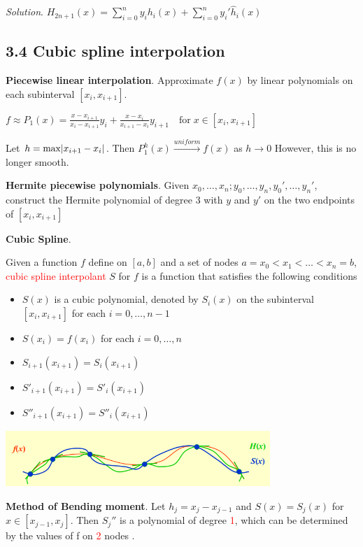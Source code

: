 \documentclass[11pt]{article}
\begin{document}
    \emph{Solution}.
    \(H_{2n+1}(x)=\displaystyle\sum_{i=0}^ny_ih_i(x)+\displaystyle\sum_{i=0}^ny_i'
    \hat{h}_i(x)\)
    \subsection{3.4 Cubic spline interpolation}
    \label{sec:org1999dd5}
    \textbf{Piecewise linear interpolation}. Approximate \(f(x)\) by linear polynomials on
    each subinterval \([x_i,x_{i+1}]\).

    \(f\approx P_1(x)=\frac{x-x_{i+1}}{x_i-x_{i+1}}y_i+\frac{x-x_i}
    {x_{i+1}-x_i}y_{i+1} \quad\text{for} \;x\in[x_i,x_{i+1}]\) 

    Let \(h=\max\abs{x_{i+1}-x_i}\). Then \(P_1^h(x)\xrightarrow{uniform} f(x)\) as
    \(h\to 0\) 
    However, this is no longer smooth.

    \textbf{Hermite piecewise polynomials}. Given
    \(x_0,\dots,x_n;y_0,\dots,y_n,y_0',\dots,y_n'\), construct the Hermite
    polynomial of degree 3 with \(y\) and \(y'\) on the two endpoints of
    \([x_i,x_{i+1}]\)

    \textbf{Cubic Spline}.
    \begin{definition}
      Given a function $f$ define on $[a,b]$ and a set of nodes $a=x_0<x_1<\dots<x_n=b$,
      \textcolor{red}{cubic spline interpolant} $S$ for $f$ is a function that satisfies
      the following conditions
      \begin{itemize}
      \item $S(x)$ is a cubic polynomial, denoted by $S_i(x)$ on the subinterval
        $[x_i,x_{i+1}]$ for each $i=0,\dots,n-1$
      \item $S(x_i)=f(x_i)$ for each $i=0,\dots, n$
      \item $S_{i+1}(x_{i+1})=S_i(x_{i+1})$
      \item $S'_{i+1}(x_{i+1})=S'_i(x_{i+1})$
      \item $S''_{i+1}(x_{i+1})=S''_i(x_{i+1})$
      \end{itemize}
    \end{definition}

    \includegraphics[width=100mm]{CubicSpline}

    \textbf{Method of Bending moment}. Let \(h_j=x_j-x_{j-1}\) and \(S(x)=S_j(x)\) for
    \(x\in[x_{j-1}, x_j]\). Then \(S_j''\) is a polynomial of degree
    \textcolor{red}{1}, which can be determined by the values of f on
    \textcolor{red}{2} nodes .
\end{document}
